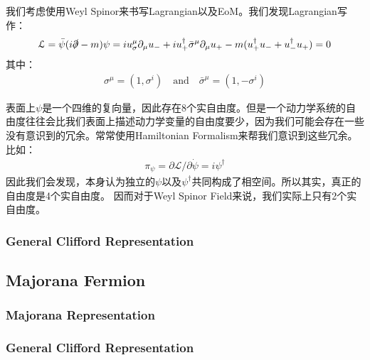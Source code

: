 \bigskip
{}

我们考虑使用Weyl Spinor来书写Lagrangian以及EoM。我们发现Lagrangian写作：
\begin{align}
  \mathcal{L}=\bar{\psi}(i \slashed{\partial}-m)\psi=iu_\sigma^{\mu}\partial_{\mu}u_{-}+iu_{+}^{\dagger}\bar{\sigma}^{\mu}\partial_{\mu}u_{+}-m(u_{+}^{\dagger}u_{-}+u_{-}^{\dagger}u_{+})=0
\end{align}
其中：
\begin{align}
  \sigma^\mu=(1,\sigma^i)\quad\mathrm{and}\quad\bar{\sigma}^\mu=(1,-\sigma^i)
\end{align}


\bigskip
{}

表面上$ \psi $是一个四维的复向量，因此存在8个实自由度。但是一个动力学系统的自由度往往会比我们表面上描述动力学变量的自由度要少，因为我们可能会存在一些没有意识到的冗余。常常使用Hamiltonian Formalism来帮我们意识到这些冗余。比如：
\begin{align}
  \pi_\psi=\partial\mathcal{L}/\partial\dot{\psi}=i\psi^\dagger
\end{align}
因此我们会发现，本身认为独立的$ \psi $以及$ \psi^\dagger $共同构成了相空间。所以其实，真正的自由度是4个实自由度。
因而对于Weyl Spinor Field来说，我们实际上只有2个实自由度。


\subsubsection{General Clifford Representation}


\subsection{Majorana Fermion}

\subsubsection{Majorana Representation}


\subsubsection{General Clifford Representation}
